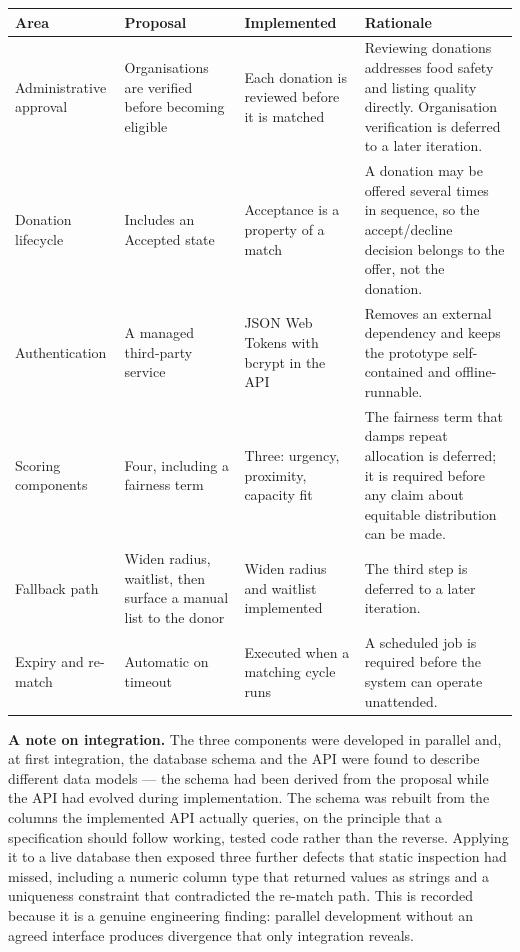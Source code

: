 \documentclass[12pt,a4paper]{report}
\begin{document}
\begin{longtable}{@{}p{2.3cm}p{3.3cm}p{3.3cm}p{4.3cm}@{}}
\toprule
\textbf{Area} & \textbf{Proposal} & \textbf{Implemented} & \textbf{Rationale} \\
\midrule
\endhead
Administrative approval & Organisations are verified before becoming eligible & Each donation is reviewed before it is matched & Reviewing donations addresses food safety and listing quality directly. Organisation verification is deferred to a later iteration. \\
Donation lifecycle & Includes an Accepted state & Acceptance is a property of a match & A donation may be offered several times in sequence, so the accept/decline decision belongs to the offer, not the donation. \\
Authentication & A managed third-party service & JSON Web Tokens with bcrypt in the API & Removes an external dependency and keeps the prototype self-contained and offline-runnable. \\
Scoring components & Four, including a fairness term & Three: urgency, proximity, capacity fit & The fairness term that damps repeat allocation is deferred; it is required before any claim about equitable distribution can be made. \\
Fallback path & Widen radius, waitlist, then surface a manual list to the donor & Widen radius and waitlist implemented & The third step is deferred to a later iteration. \\
Expiry and re-match & Automatic on timeout & Executed when a matching cycle runs & A scheduled job is required before the system can operate unattended. \\
\bottomrule
\end{longtable}

\textbf{A note on integration.} The three components were developed in parallel and, at first integration, the database schema and the API were found to describe different data models --- the schema had been derived from the proposal while the API had evolved during implementation. The schema was rebuilt from the columns the implemented API actually queries, on the principle that a specification should follow working, tested code rather than the reverse. Applying it to a live database then exposed three further defects that static inspection had missed, including a numeric column type that returned values as strings and a uniqueness constraint that contradicted the re-match path. This is recorded because it is a genuine engineering finding: parallel development without an agreed interface produces divergence that only integration reveals.
\end{document}
